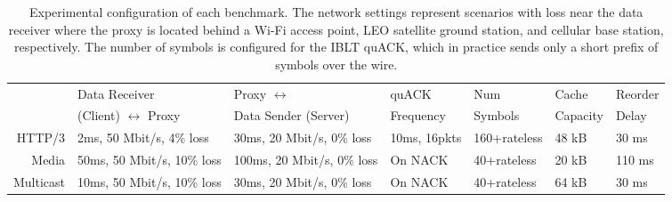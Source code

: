 \begin{table*}
    \centering
    \begin{tabular}{r l l l l l l}
        \toprule
        \bf
        & Data Receiver & Proxy $\leftrightarrow$ & quACK & Num & Cache & Reorder \\
        & (Client) $\leftrightarrow$ Proxy & Data Sender (Server) &  Frequency & Symbols & Capacity & Delay \\
        \midrule
         HTTP/3 & 2ms, 50 Mbit/s, 4\% loss & 30ms, 20 Mbit/s, 0\% loss & 10ms, 16pkts & 160+rateless & 48 kB & 30 ms \\
         Media & 50ms, 50 Mbit/s, 10\% loss & 100ms, 20 Mbit/s, 0\% loss & On NACK & 40+rateless & 20 kB & 110 ms \\
         Multicast & 10ms, 50 Mbit/s, 10\% loss & 30ms, 20 Mbit/s, 0\% loss & On NACK & 40+rateless & 64 kB & 30 ms \\
         \bottomrule
    \end{tabular}
    \caption{Experimental configuration of each  benchmark. The network settings
     represent scenarios with loss near the data receiver where the proxy is
     located behind a Wi-Fi access point, LEO satellite ground station, and
     cellular base station, respectively. The number of symbols is configured
     for the IBLT quACK, which in practice sends only a short prefix of symbols
     over the wire.
     }
    \label{tab:experiment-config}
\end{table*}